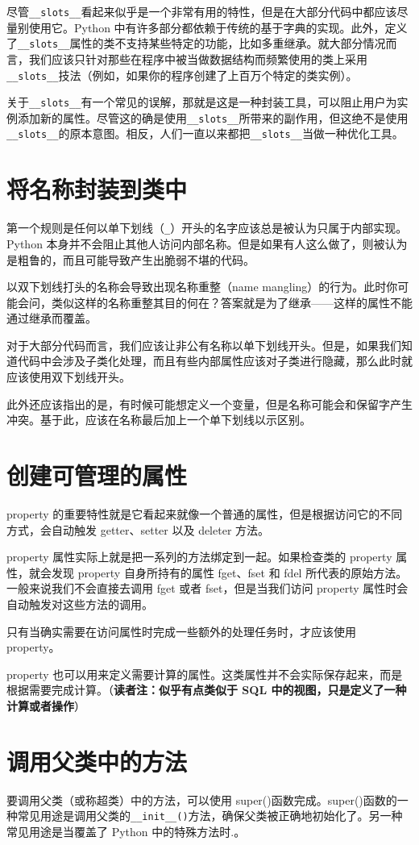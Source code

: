 尽管\verb|__slots__|看起来似乎是一个非常有用的特性，但是在大部分代码中都应该尽量别使用它。Python 中有许多部分都依赖于传统的基于字典的实现。此外，定义了\verb|__slots__|属性的类不支持某些特定的功能，比如多重继承。就大部分情况而言，我们应该只针对那些在程序中被当做数据结构而频繁使用的类上采用\verb|__slots__|技法（例如，如果你的程序创建了上百万个特定的类实例）。

关于\verb|__slots__|有一个常见的误解，那就是这是一种封装工具，可以阻止用户为实例添加新的属性。尽管这的确是使用\verb|__slots__|所带来的副作用，但这绝不是使用\verb|__slots__|的原本意图。相反，人们一直以来都把\verb|__slots__|当做一种优化工具。
\section{将名称封装到类中}
第一个规则是任何以单下划线（\verb|_|）开头的名字应该总是被认为只属于内部实现。Python 本身并不会阻止其他人访问内部名称。但是如果有人这么做了，则被认为是粗鲁的，而且可能导致产生出脆弱不堪的代码。

以双下划线打头的名称会导致出现名称重整（name mangling）的行为。此时你可能会问，类似这样的名称重整其目的何在？答案就是为了继承——这样的属性不能通过继承而覆盖。

对于大部分代码而言，我们应该让非公有名称以单下划线开头。但是，如果我们知道代码中会涉及子类化处理，而且有些内部属性应该对子类进行隐藏，那么此时就应该使用双下划线开头。

此外还应该指出的是，有时候可能想定义一个变量，但是名称可能会和保留字产生冲突。基于此，应该在名称最后加上一个单下划线以示区别。
\section{创建可管理的属性}
property 的重要特性就是它看起来就像一个普通的属性，但是根据访问它的不同方式，会自动触发 getter、setter 以及 deleter 方法。

property 属性实际上就是把一系列的方法绑定到一起。如果检查类的 property 属性，就会发现 property 自身所持有的属性 fget、fset 和 fdel 所代表的原始方法。一般来说我们不会直接去调用 fget 或者 fset，但是当我们访问 property 属性时会自动触发对这些方法的调用。

只有当确实需要在访问属性时完成一些额外的处理任务时，才应该使用 property。

property 也可以用来定义需要计算的属性。这类属性并不会实际保存起来，而是根据需要完成计算。（\textbf{读者注：似乎有点类似于 SQL 中的视图，只是定义了一种计算或者操作}）
\section{调用父类中的方法}
要调用父类（或称超类）中的方法，可以使用 super()函数完成。super()函数的一种常见用途是调用父类的\verb|__init__()|方法，确保父类被正确地初始化了。另一种常见用途是当覆盖了 Python 中的特殊方法时.。

